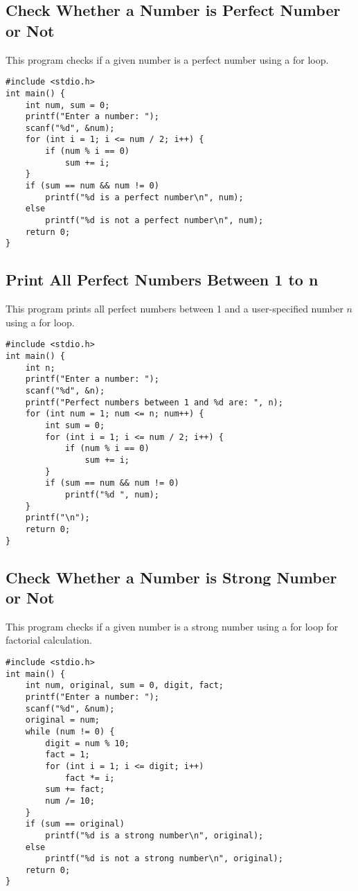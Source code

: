 \documentclass[a4paper,12pt]{article}
\begin{document}
\newpage

\subsection{Check Whether a Number is Perfect Number or Not}
This program checks if a given number is a perfect number using a for loop.

\begin{lstlisting}[caption={Check Whether a Number is Perfect Number or Not}]
#include <stdio.h>
int main() {
    int num, sum = 0;
    printf("Enter a number: ");
    scanf("%d", &num);
    for (int i = 1; i <= num / 2; i++) {
        if (num % i == 0)
            sum += i;
    }
    if (sum == num && num != 0)
        printf("%d is a perfect number\n", num);
    else
        printf("%d is not a perfect number\n", num);
    return 0;
}
\end{lstlisting}

\newpage

\subsection{Print All Perfect Numbers Between 1 to n}
This program prints all perfect numbers between 1 and a user-specified number \(n\) using a for loop.

\begin{lstlisting}[caption={Print All Perfect Numbers Between 1 to n}]
#include <stdio.h>
int main() {
    int n;
    printf("Enter a number: ");
    scanf("%d", &n);
    printf("Perfect numbers between 1 and %d are: ", n);
    for (int num = 1; num <= n; num++) {
        int sum = 0;
        for (int i = 1; i <= num / 2; i++) {
            if (num % i == 0)
                sum += i;
        }
        if (sum == num && num != 0)
            printf("%d ", num);
    }
    printf("\n");
    return 0;
}
\end{lstlisting}

\newpage

\subsection{Check Whether a Number is Strong Number or Not}
This program checks if a given number is a strong number using a for loop for factorial calculation.

\begin{lstlisting}[caption={Check Whether a Number is Strong Number or Not}]
#include <stdio.h>
int main() {
    int num, original, sum = 0, digit, fact;
    printf("Enter a number: ");
    scanf("%d", &num);
    original = num;
    while (num != 0) {
        digit = num % 10;
        fact = 1;
        for (int i = 1; i <= digit; i++)
            fact *= i;
        sum += fact;
        num /= 10;
    }
    if (sum == original)
        printf("%d is a strong number\n", original);
    else
        printf("%d is not a strong number\n", original);
    return 0;
}
\end{lstlisting}
\end{document}
